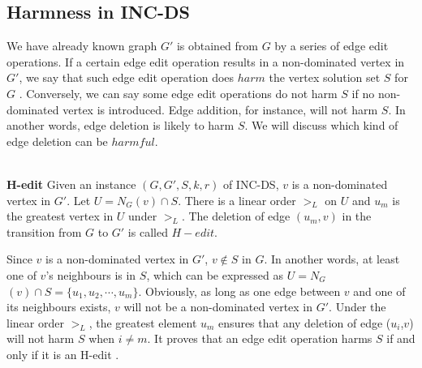 \subsection{Harmness in \large{I}\normalsize{NC}-\large{DS}} \label{subsec:harmincds}
We have already known graph $G'$ is obtained from $G$ by a series of edge edit operations. If a certain edge edit operation results in a non-dominated vertex in $G'$, we say that such edge edit operation does $harm$ the vertex solution set $S$ for $G$ \cite{downey2014}.  Conversely, we can say some edge edit operations do not harm $S$ if no non-dominated vertex is introduced. Edge addition, for instance, will not harm $S$. In another words, edge deletion is likely to harm $S$. We will discuss which kind of edge deletion can be $harmful$.
\\
\\
\begin{defn} \textbf{H-edit} \cite{downey2014} Given an instance $(G,G',S,k,r)$ of \large{I}\normalsize{NC}-\large{DS}, $v$ is a non-dominated vertex in $G'$. Let $U=N_G$$(v)\cap S$. There is a linear order $>_L$ on $U$ and $u_m$ is the greatest vertex in $U$ under $>_L$. The deletion of edge $(u_m,v)$ in the transition from $G$ to $G'$ is called $H-edit$.
\end{defn}
Since $v$ is a non-dominated vertex in $G'$, $v \notin S$ in $G$. In another words, at least one of $v$'s neighbours is in $S$, which can be expressed as $U=N_G$$(v)\cap S=\{u_1,u_2,\cdots,u_m\}$. Obviously, as long as one edge between $v$ and one of its neighbours exists, $v$ will not be a non-dominated vertex in $G'$. Under the linear order $>_L$, the greatest element $u_m$ ensures that any deletion of edge ($u_i$,$v$) will not harm $S$ when $i\neq m$. It proves that an edge edit operation harms $S$ if and only if it is an H-edit \cite{downey2014}.
